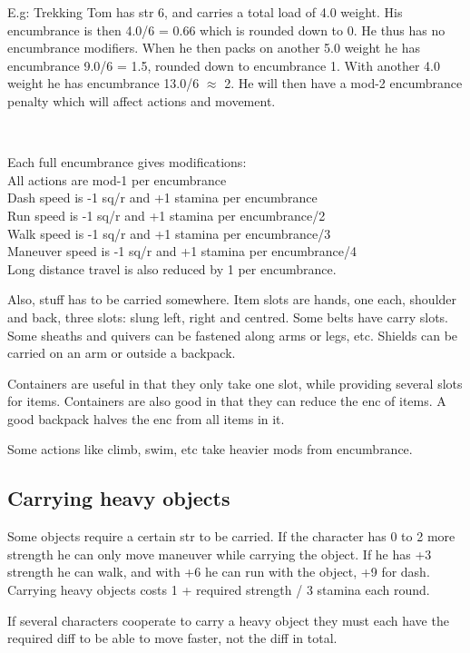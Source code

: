 E.g: Trekking Tom has str 6, and carries a total load of 4.0 weight. His encumbrance is then 4.0/6 = 0.66 which is rounded down to 0. He thus has no encumbrance modifiers. When he then packs on another 5.0 weight he has encumbrance 9.0/6 = 1.5, rounded down to encumbrance 1. With another 4.0 weight he has encumbrance 13.0/6 $\approx$ 2. He will then have a mod-2 encumbrance penalty which will affect actions and movement.

\

\begin{samepage}
\noindent
Each full encumbrance gives modifications: \\
All actions are mod-1 per encumbrance \\
Dash speed is -1 sq/r and +1 stamina per encumbrance \\
Run speed is -1 sq/r and +1 stamina per encumbrance/2 \\
Walk speed is -1 sq/r and +1 stamina per encumbrance/3 \\
Maneuver speed is -1 sq/r and +1 stamina per encumbrance/4 \\
Long distance travel is also reduced by 1 per encumbrance.
\end{samepage}

Also, stuff has to be carried somewhere. Item slots are hands, one each, shoulder and back, three slots: slung left, right and centred. Some belts have carry slots. Some sheaths and quivers can be fastened along arms or legs, etc. Shields can be carried on an arm or outside a backpack.

Containers are useful in that they only take one slot, while providing several slots for items. Containers are also good in that they can reduce the enc of items. A good backpack halves the enc from all items in it.

Some actions like climb, swim, etc take heavier mods from encumbrance.


\subsection*{Carrying heavy objects}
Some objects require a certain str to be carried. If the character has 0 to 2 more strength he can only move maneuver while carrying the object. If he has +3 strength he can walk, and with +6 he can run with the object, +9 for dash.
Carrying heavy objects costs 1 + required strength / 3 stamina each round.

If several characters cooperate to carry a heavy object they must each have the required diff to be able to move faster, not the diff in total.

